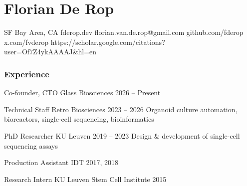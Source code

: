\documentclass{tccv}
\begin{document}
\part{Florian De Rop}
\personal
{SF Bay Area, CA}
{fderop.dev}
{florian.van.de.rop@gmail.com}
{github.com/fderop}
{x.com/fvderop}
{https://scholar.google.com/citations?user=Of7Z4ykAAAAJ\&hl=en}
\section{Experience}
\begin{eventlist}
      \item{Co-founder, CTO}
            {Glass Biosciences}
            {2026 -- Present}
            {}

      \item{Technical Staff}
            {Retro Biosciences}
            {2023 -- 2026}
            {Organoid culture automation, bioreactors, single-cell sequencing, bioinformatics}

      \item{PhD Researcher}
            {KU Leuven}
            {2019 -- 2023}
            {Design \& development of single-cell sequencing assays}




      \item{Production Assistant}
            {IDT}
            {2017, 2018}
            {}



      \item{Research Intern}
            {KU Leuven Stem Cell Institute}
            {2015}
            {}

\end{eventlist}
\end{document}
